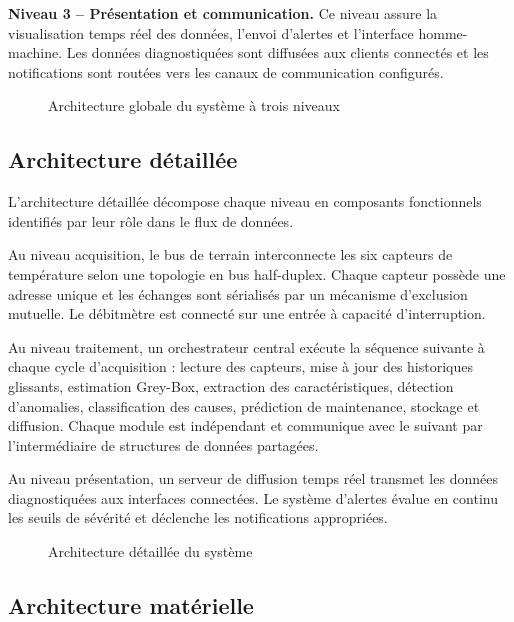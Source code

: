 \textbf{Niveau 3 -- Présentation et communication.} Ce niveau assure la visualisation temps réel des données, l'envoi d'alertes et l'interface homme-machine. Les données diagnostiquées sont diffusées aux clients connectés et les notifications sont routées vers les canaux de communication configurés.

\begin{figure}[htbp]
  \centering
  \caption{Architecture globale du système à trois niveaux}
\end{figure}

\subsection{Architecture détaillée}

L'architecture détaillée décompose chaque niveau en composants fonctionnels identifiés par leur rôle dans le flux de données.

Au niveau acquisition, le bus de terrain interconnecte les six capteurs de température selon une topologie en bus half-duplex. Chaque capteur possède une adresse unique et les échanges sont sérialisés par un mécanisme d'exclusion mutuelle. Le débitmètre est connecté sur une entrée à capacité d'interruption.

Au niveau traitement, un orchestrateur central exécute la séquence suivante à chaque cycle d'acquisition : lecture des capteurs, mise à jour des historiques glissants, estimation Grey-Box, extraction des caractéristiques, détection d'anomalies, classification des causes, prédiction de maintenance, stockage et diffusion. Chaque module est indépendant et communique avec le suivant par l'intermédiaire de structures de données partagées.

Au niveau présentation, un serveur de diffusion temps réel transmet les données diagnostiquées aux interfaces connectées. Le système d'alertes évalue en continu les seuils de sévérité et déclenche les notifications appropriées.

\begin{figure}[htbp]
  \centering
  \caption{Architecture détaillée du système}
\end{figure}

\subsection{Architecture matérielle}


